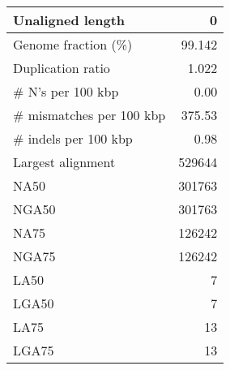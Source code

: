 \documentclass[12pt,a4paper]{article}
\begin{document}
\begin{table}[ht]
\begin{center}
\begin{tabular}{|l*{1}{|r}|}
Unaligned length & 0 \\ \hline
Genome fraction (\%) & 99.142 \\ \hline
Duplication ratio & 1.022 \\ \hline
\# N's per 100 kbp & 0.00 \\ \hline
\# mismatches per 100 kbp & 375.53 \\ \hline
\# indels per 100 kbp & 0.98 \\ \hline
Largest alignment & 529644 \\ \hline
NA50 & 301763 \\ \hline
NGA50 & 301763 \\ \hline
NA75 & 126242 \\ \hline
NGA75 & 126242 \\ \hline
LA50 & 7 \\ \hline
LGA50 & 7 \\ \hline
LA75 & 13 \\ \hline
LGA75 & 13 \\ \hline
\end{tabular}
\end{center}
\end{table}
\end{document}
